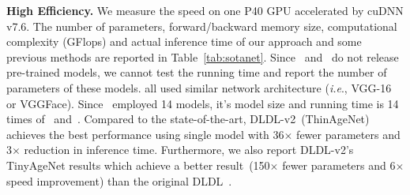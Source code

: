 \documentclass[5p,times,twocolumn]{elsarticle}
\makeatletter
\DeclareRobustCommand\onedot{\@onedot}
\def\@onedot{.}
\def\ie{\emph{i.e}\onedot}
\makeatother
\begin{document}
\textbf{High Efficiency.} We measure the speed on one {P40 GPU accelerated by cuDNN v7.6}. 
The number of parameters, {forward/backward memory size, computational complexity (GFlops) and actual inference time}
of our approach and some previous methods are reported in Table~\ref{tab:sotanet}. Since~\cite{niu2016ordinal} and~\cite{chen2017using} do not release pre-trained models, we cannot test the running time and report the number of parameters of these models. \cite{gao2017deep,rothe2016deep,antipov2017effective,shen2017label,shen2017deep,pan2018mean,tan2018efficient,li2019bridgenet,liu2020similarity,li2021learning,liu2017ordinal,tan2018efficient,li2019bridgenet,liu2020similarity,li2021learning,liu2017ordinal} all used similar network architecture (\ie, VGG-16 or VGGFace). Since~\cite{antipov2016apparent} employed 14 models, it's model size and running time is 14 times of~\cite{rothe2016deep} and~\cite{gao2017deep}. Compared to the state-of-the-art, DLDL-v2~(ThinAgeNet) achieves the best performance using single model with 36$\times$ fewer parameters and 3$\times$ reduction in inference time. Furthermore, we also report DLDL-v2's TinyAgeNet results which achieve a better result~(150$\times$ fewer parameters and 6$\times$ speed improvement) than the original DLDL~\cite{gao2017deep}. 
\end{document}
